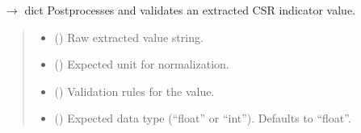 \documentclass[letterpaper,10pt,english]{sphinxmanual}
\begin{document}

\begin{fulllineitems}
\label{\detokenize{autoapi/modules/input/postprocess/index:modules.input.postprocess.postprocess_value}}
\pysigstartsignatures
\pysiglinewithargsret
{}
{\sphinxparamcomma {}\sphinxparamcomma {}\sphinxparamcomma {}\sphinxparamcomma {}}
{{ $\rightarrow$ dict}}
\pysigstopsignatures
\sphinxAtStartPar
Postprocesses and validates an extracted CSR indicator value.
\begin{quote}\begin{description}
\begin{itemize}
\item {} 
\sphinxAtStartPar
{} () \textendash{} Raw extracted value string.

\item {} 
\sphinxAtStartPar
{} () \textendash{} Expected unit for normalization.

\item {} 
\sphinxAtStartPar
{} () \textendash{} Validation rules for the value.

\item {} 
\sphinxAtStartPar
{} (\sphinxstyleliteralemphasis{\sphinxupquote{, }}) \textendash{} Expected data type (“float” or “int”). Defaults to “float”.


\end{itemize}
\end{description}
\end{quote}
\end{fulllineitems}
\end{document}
